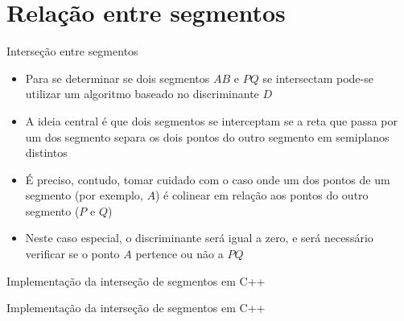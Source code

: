 \section{Relação entre segmentos}

\begin{frame}[fragile]{Interseção entre segmentos}

    \begin{itemize}
        \item Para se determinar se dois segmentos $AB$ e $PQ$ se intersectam pode-se utilizar um
            algoritmo baseado no discriminante $D$
        \pause

        \item A ideia central é que dois segmentos se interceptam se a reta que passa por um
            dos segmento separa os dois pontos do outro segmento em semiplanos distintos
        \pause

        \item É preciso, contudo, tomar cuidado com o caso onde um dos pontos de um segmento
            (por exemplo, $A$) é colinear em relação aos pontos do outro segmento ($P$ e $Q$)
        \pause

        \item Neste caso especial, o discriminante será igual a zero, e será necessário verificar
            se o ponto $A$ pertence ou não a $PQ$
    \end{itemize}

\end{frame}

\begin{frame}[fragile]{Implementação da interseção de segmentos em C++}
\end{frame}

\begin{frame}[fragile]{Implementação da interseção de segmentos em C++}
\end{frame}
